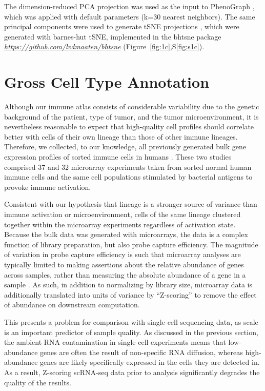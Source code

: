 The dimension-reduced PCA projection was used as the input to PhenoGraph \citep{Levine2015}, which was applied with default parameters (k=30 nearest neighbors). 
The same principal components were used to generate tSNE projections \citep{Maaten2008}, which were generated with barnes-hut tSNE, implemented in the bhtsne package \href{https://github.com/lvdmaaten/bhtsne}{\emph{https://github.com/lvdmaaten/bhtsne}} (Figure~\ref{fig:1c},S\ref{fig:s1c}).

\section{Gross Cell Type Annotation}

Although our immune atlas consists of considerable variability due to the genetic background of the patient, type of tumor, and the tumor microenvironment, it is nevertheless reasonable to expect that high-quality cell profiles should correlate better with cells of their own lineage than those of other immune lineages. 
Therefore, we collected, to our knowledge, all previously generated bulk gene expression profiles of sorted immune cells in humans \citep{Novershtern2011,Jeffrey2006}.
These two studies comprised 37 and 32 microarray experiments taken from sorted normal human immune cells and the same cell populations stimulated by bacterial antigens to provoke immune activation. 

Consistent with our hypothesis that lineage is a stronger source of variance than immune activation or microenvironment, cells of the same lineage clustered together within the microarray experiments regardless of activation state. 
Because the bulk data was generated with microarrays, the data is a complex function of library preparation, but also probe capture efficiency. 
The magnitude of variation in probe capture efficiency is such that microarray analyses are typically limited to making assertions about the relative abundance of genes across samples, rather than measuring the absolute abundance of a gene in a sample \citep{Tusher2001}. 
As such, in addition to normalizing by library size, microarray data is additionally translated into units of variance by ``Z-scoring'' to remove the effect of abundance on downstream computation. 

This presents a problem for comparison with single-cell sequencing data, as scale is an important predictor of sample quality. As discussed in the previous section, the ambient RNA contamination in single cell experiments means that low-abundance genes are often the result of non-specific RNA diffusion, whereas high-abundance genes are likely specifically expressed in the cells they are detected in. 
As a result, Z-scoring scRNA-seq data prior to analysis significantly degrades the quality of the results. 

